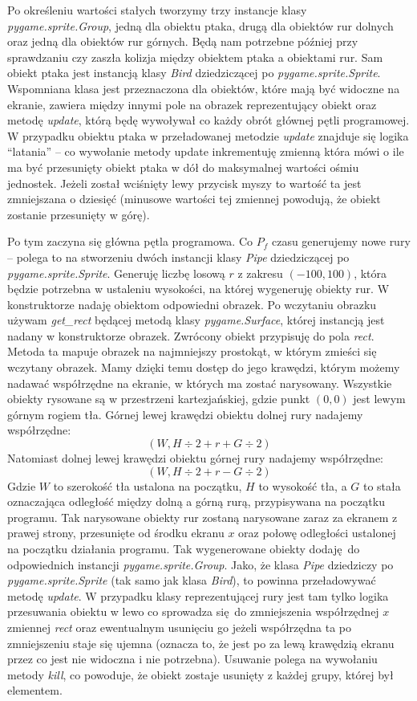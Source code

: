 \documentclass[a4paper, 12pt,oneside]{book}
\begin{document}
Po określeniu wartości stałych tworzymy trzy instancje klasy
\textit{pygame.sprite.Group}, jedną dla obiektu ptaka, drugą dla obiektów rur
dolnych oraz jedną dla obiektów rur górnych. Będą nam potrzebne później przy
sprawdzaniu czy zaszła kolizja między obiektem ptaka a obiektami rur.
Sam obiekt ptaka jest instancją klasy \textit{Bird} dziedziczącej po
\textit{pygame.sprite.Sprite}. Wspomniana klasa jest przeznaczona dla obiektów,
które mają być widoczne na ekranie, zawiera między innymi
pole na obrazek reprezentujący obiekt oraz metodę
\textit{update}\cite{pygame_sprite_documentation}, którą będę wywoływał co
każdy obrót głównej pętli programowej. W przypadku obiektu ptaka w
przeładowanej metodzie \textit{update} znajduje się logika ``latania'' --
co wywołanie metody update inkrementuję zmienną która mówi o ile ma
być przesunięty obiekt ptaka w dół do maksymalnej wartości ośmiu jednostek.
Jeżeli został wciśnięty lewy przycisk myszy to wartość ta jest zmniejszana o
dziesięć (minusowe wartości tej zmiennej powodują, że obiekt zostanie
przesunięty w górę).

Po tym zaczyna się główna pętla programowa. Co $P_f$ czasu generujemy nowe rury
-- polega to na stworzeniu dwóch instancji klasy \textit{Pipe} dziedziczącej
po \textit{pygame.sprite.Sprite}. Generuję liczbę losową $r$ z zakresu
$(-100, 100)$, która będzie potrzebna w ustaleniu wysokości, na której 
wygeneruję obiekty rur. W konstruktorze nadaję obiektom odpowiedni
obrazek. Po wczytaniu obrazku używam \textit{get\_rect}
będącej metodą klasy \textit{pygame.Surface}, której instancją jest nadany w
konstruktorze obrazek. Zwrócony obiekt przypisuję do pola \textit{rect}.
Metoda ta mapuje obrazek na najmniejszy prostokąt, w którym zmieści się
wczytany obrazek. Mamy dzięki temu dostęp do jego krawędzi, którym możemy
nadawać współrzędne na ekranie, w których ma zostać narysowany.
Wszystkie obiekty rysowane są w przestrzeni kartezjańskiej, gdzie punkt
$(0,0)$ jest lewym górnym rogiem tła.
Górnej lewej krawędzi obiektu dolnej rury nadajemy współrzędne:
\[(W, H \div 2 + r + G \div 2)\]
Natomiast dolnej lewej krawędzi obiektu górnej rury nadajemy współrzędne:
\[(W, H \div 2 + r - G \div 2)\]
Gdzie $W$ to szerokość tła ustalona na początku, $H$ to wysokość tła, a
$G$ to stała oznaczająca odległość między dolną a górną rurą, przypisywana
na początku programu. 
Tak narysowane obiekty rur zostaną narysowane zaraz za ekranem z prawej strony,
przesunięte od środku ekranu $x$ oraz połowę odległości ustalonej na początku
działania programu. Tak wygenerowane obiekty dodaję do odpowiednich instancji
\textit{pygame.sprite.Group}. Jako, że klasa \textit{Pipe} dziedziczy po
\textit{pygame.sprite.Sprite} (tak samo jak klasa \textit{Bird}), to powinna
przeładowywać metodę \textit{update}\cite{pygame_sprite_documentation}.
W przypadku klasy reprezentującej rury jest tam tylko logika przesuwania
obiektu w lewo co sprowadza się do zmniejszenia współrzędnej $x$ 
zmiennej \textit{rect} oraz ewentualnym usunięciu go jeżeli współrzędna ta
po zmniejszeniu staje się ujemna (oznacza to, że jest po za lewą krawędzią
ekranu przez co jest nie widoczna i nie potrzebna). Usuwanie polega na
wywołaniu metody \textit{kill}, co powoduje, że obiekt zostaje usunięty
z każdej grupy, której był elementem.
\end{document}
